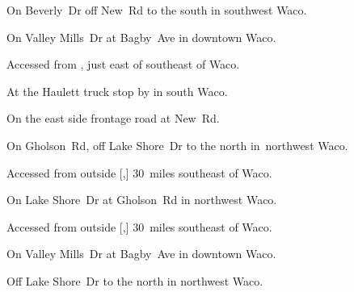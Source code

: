 
\begin{LocationList}

On Beverly~Dr off New~Rd to the south in southwest Waco.

On  Valley Mills~Dr at Bagby~Ave in downtown Waco.

Accessed from , just east of  southeast of Waco.

At the Haulett truck stop by   in south Waco.

On the east side  frontage road at New~Rd.

On  Gholson~Rd, off  Lake Shore~Dr to the north in~northwest Waco.

Accessed from  outside [,] 30~miles southeast of Waco.

On  Lake Shore~Dr at  Gholson~Rd in northwest Waco.

Accessed from  outside [,] 30~miles southeast of Waco.

On  Valley Mills~Dr at Bagby~Ave in downtown Waco.

Off  Lake Shore~Dr to the north in northwest Waco.

\end{LocationList}
